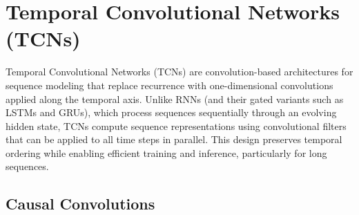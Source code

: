 \documentclass{article}
\begin{document}


\section{Temporal Convolutional Networks (TCNs)}

Temporal Convolutional Networks (TCNs) are convolution-based architectures for sequence modeling that replace recurrence with one-dimensional convolutions applied along the temporal axis. Unlike RNNs (and their gated variants such as LSTMs and GRUs), which process sequences sequentially through an evolving hidden state, TCNs compute sequence representations using convolutional filters that can be applied to all time steps in parallel. This design preserves temporal ordering while enabling efficient training and inference, particularly for long sequences.

\subsection{Causal Convolutions}
\end{document}
